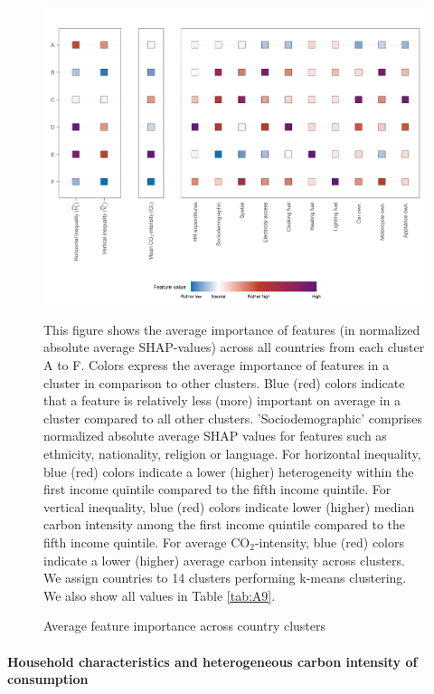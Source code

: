\documentclass[12pt, a4paper]{article}
\newenvironment{subcaption2}
{\strut
\vspace{-5pt}
\begin{minipage}[b]{0.9\textwidth}
  \hspace*{-\parindent}
  \footnotesize}
 {\end{minipage}}
\begin{document}
\begin{figure}[ht!]
    \centering
    \includegraphics{1_Figures/Figure 3/Figure_3_Corrected.jpg}
    \caption{Average feature importance across country clusters}
    \label{fig:fig_3}
    \begin{subcaption2}
    This figure shows the average importance of features (in normalized absolute average SHAP-values) across all countries from each cluster A to F. Colors express the average importance of features in a cluster in comparison to other clusters. Blue (red) colors indicate that a feature is relatively less (more) important on average in a cluster compared to all other clusters. 'Sociodemographic' comprises normalized absolute average SHAP values for features such as ethnicity, nationality, religion or language.
    For horizontal inequality, blue (red) colors indicate a lower (higher) heterogeneity within the first income quintile compared to the fifth income quintile. For vertical inequality, blue (red) colors indicate lower (higher) median carbon intensity among the first income quintile compared to the fifth income quintile. For average CO$_{2}$-intensity, blue (red) colors indicate a lower (higher) average carbon intensity across clusters. We assign countries to 14 clusters performing k-means clustering. We also show all values in Table \ref{tab:A9}.
    \end{subcaption2}
\end{figure}

\paragraph{Household characteristics and heterogeneous carbon intensity of consumption}
\end{document}
